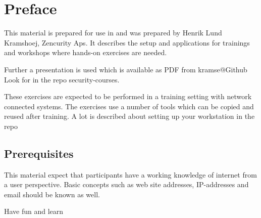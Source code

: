 \documentclass[a4paper,11pt,notitlepage]{report}
\begin{document}
\rm
{}

\newcommand{\course}[1]{System Integration F2020}


\setcounter{tocdepth}{0}

\normal

{\color{titlecolor}\tableofcontents}

\normal
\pagestyle{fancyplain}
\chapter*{\color{titlecolor}Preface}

This material is prepared for use in \emph{\course} and was prepared by
Henrik Lund Kramshoej, Zencurity Aps.
It describes the setup and
applications for trainings and workshops where hands-on exercises are needed.

\vskip 1cm
Further a presentation is used which is available as PDF from kramse@Github\\
Look for \jobname in the repo security-courses.

These exercises are expected to be performed in a training setting with network
connected systems. The exercises use a number of tools which can be copied and
reused after training. A lot is described about setting up your workstation in
the repo




\section*{\color{titlecolor}Prerequisites}

This material expect that participants have a working knowledge of internet from
a user perspective. Basic concepts such as web site addresses, IP-addresses and
email should be known as well.

\vskip 1cm
Have fun and learn
\eject

\rhead{\fancyplain{}{\bf \chaptername\ \thechapter}}

\end{document}
